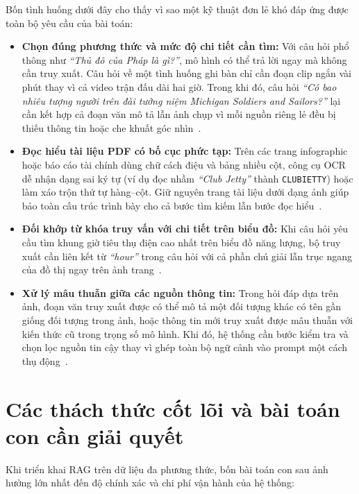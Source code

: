Bốn tình huống dưới đây cho thấy vì sao một kỹ thuật đơn lẻ khó đáp ứng được toàn bộ yêu cầu của bài toán:
\begin{itemize}
    \item \textbf{Chọn đúng phương thức và mức độ chi tiết cần tìm:} Với câu hỏi phổ thông như \textit{``Thủ đô của Pháp là gì?''}, mô hình có thể trả lời ngay mà không cần truy xuất. Câu hỏi về một tình huống ghi bàn chỉ cần đoạn clip ngắn vài phút thay vì cả video trận đấu dài hai giờ. Trong khi đó, câu hỏi \textit{``Có bao nhiêu tượng người trên đài tưởng niệm Michigan Soldiers and Sailors?''} lại cần kết hợp cả đoạn văn mô tả lẫn ảnh chụp vì mỗi nguồn riêng lẻ đều bị thiếu thông tin hoặc che khuất góc nhìn~\cite{yeo2026universalrag}.
    \item \textbf{Đọc hiểu tài liệu PDF có bố cục phức tạp:} Trên các trang infographic hoặc báo cáo tài chính dùng chữ cách điệu và bảng nhiều cột, công cụ OCR dễ nhận dạng sai ký tự (ví dụ đọc nhầm \textit{``Club Jetty''} thành \texttt{CLUBIETTY}) hoặc làm xáo trộn thứ tự hàng--cột. Giữ nguyên trang tài liệu dưới dạng ảnh giúp bảo toàn cấu trúc trình bày cho cả bước tìm kiếm lẫn bước đọc hiểu~\cite{yu2025visrag,faysse2025colpali}.
    \item \textbf{Đối khớp từ khóa truy vấn với chi tiết trên biểu đồ:} Khi câu hỏi yêu cầu tìm khung giờ tiêu thụ điện cao nhất trên biểu đồ năng lượng, bộ truy xuất cần liên kết từ \textit{``hour''} trong câu hỏi với cả phần chú giải lẫn trục ngang của đồ thị ngay trên ảnh trang~\cite{faysse2025colpali}.
    \item \textbf{Xử lý mâu thuẫn giữa các nguồn thông tin:} Trong hỏi đáp dựa trên ảnh, đoạn văn truy xuất được có thể mô tả một đối tượng khác có tên gần giống đối tượng trong ảnh, hoặc thông tin mới truy xuất được mâu thuẫn với kiến thức cũ trong trọng số mô hình. Khi đó, hệ thống cần bước kiểm tra và chọn lọc nguồn tin cậy thay vì ghép toàn bộ ngữ cảnh vào prompt một cách thụ động~\cite{tian2025coremmrag}.
\end{itemize}

\section{Các thách thức cốt lõi và bài toán con cần giải quyết}
\label{sec:intro_challenges}

Khi triển khai RAG trên dữ liệu đa phương thức, bốn bài toán con sau ảnh hưởng lớn nhất đến độ chính xác và chi phí vận hành của hệ thống:

